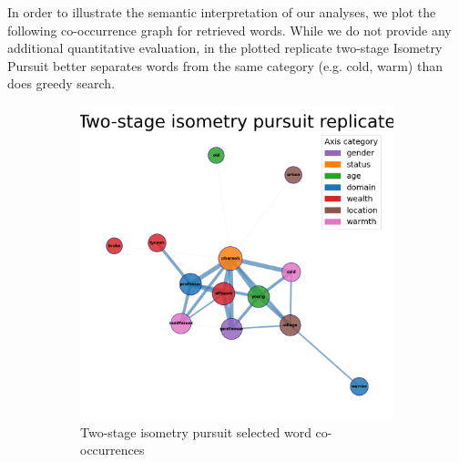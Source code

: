 In order to illustrate the semantic interpretation of our analyses, we plot the following co-occurrence graph for retrieved words.
While we do not provide any additional quantitative evaluation, in the plotted replicate two-stage Isometry Pursuit better separates words from the same category (e.g. cold, warm) than does greedy search.

\begin{figure}[h]
    \centering
    \begin{subfigure}[b]{0.47\textwidth}
        \centering
        \includegraphics[width=\textwidth]{../figures/ip_graph.png}
        \caption{Two-stage isometry pursuit selected word co-occurrences}
        \label{fig:co_occurrence_brute}
    \end{subfigure}
    \hfill
    \begin{subfigure}[b]{0.47\textwidth}
        \centering

\end{subfigure}
\end{figure}
